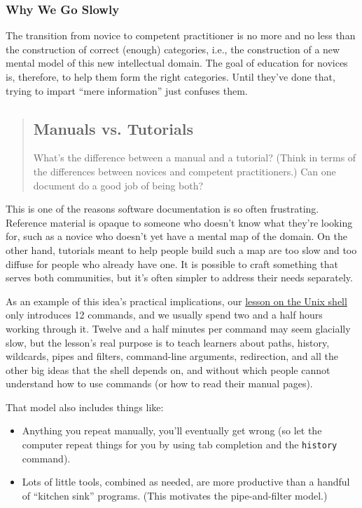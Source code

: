 \subsubsection*{Why We Go Slowly}

The transition from novice to competent practitioner is no more
and no less than
the construction of correct (enough) categories,
i.e.,
the construction of a new mental model of this new intellectual domain.
The goal of education for novices is, therefore,
to help them form the right categories.
Until they've done that,
trying to impart ``mere information'' just confuses them.

\begin{quotation}   %
\subsection*{Manuals vs. Tutorials}

What's the difference between a manual and a tutorial?
(Think in terms of the differences between novices and competent practitioners.)
Can one document do a good job of being both?
\end{quotation}   %

This is one of the reasons software documentation is so often frustrating.
Reference material is opaque to someone who doesn't know what they're looking for,
such as a novice who doesn't yet have a mental map of the domain.
On the other hand,
tutorials meant to help people build such a map
are too slow and too diffuse for people who already have one.
It is possible to craft something that serves both communities,
but it's often simpler to address their needs separately.

As an example of this idea's practical implications,
our \href{http://swcarpentry.github.io/shell-novice/}{lesson on the Unix shell} only introduces 12 commands,
and we usually spend two and a half hours working through it.
Twelve and a half minutes per command may seem glacially slow,
but the lesson's real purpose is to teach learners about paths,
history,
wildcards,
pipes and filters,
command-line arguments,
redirection,
and all the other big ideas that the shell depends on,
and without which people cannot understand how to use commands
(or how to read their manual pages).

That model also includes things like:

\begin{itemize}
\item Anything you repeat manually, you'll eventually get wrong
(so let the computer repeat things for you by using tab completion
and the \texttt{history} command).
\item Lots of little tools, combined as needed, are more productive than
a handful of ``kitchen sink'' programs.
(This motivates the pipe-and-filter model.)
\end{itemize}

